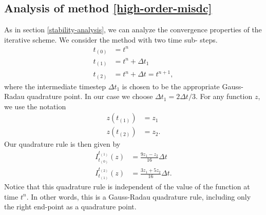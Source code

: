 \documentclass[12pt]{article}
\begin{document}
\subsection{Analysis of method \ref{high-order-misdc}}
As in section \ref{stability-analysis}, we can analyze the convergence 
properties of the iterative scheme. We consider the method with two time sub-%
steps.
\begin{align*}
    t_{(0)} &= t^n\\
    t_{(1)} &= t^n + \Delta t_1\\
    t_{(2)} &= t^n + \Delta t = t^{n+1},
\end{align*}
where the intermediate timestep $\Delta t_1$ is chosen to be the appropriate 
Gauss-Radau quadrature point. In our case we choose $\Delta t_1 = 2\Delta t/3$. 
For any function $z$, we use the notation
\begin{align*}
    z(t_{(1)}) &= z_1\\
    z(t_{(2)}) &= z_2.
\end{align*}
Our quadrature rule is then given by
\begin{align}
    I_{t_{(0)}}^{t_{(1)}}(z) &= \frac{9 z_1 - z_2}{16} \Delta t \label{qr-1}\\
    I_{t_{(1)}}^{t_{(2)}}(z) &= \frac{3 z_1 + 5 z_2}{16} \Delta t. \label{qr-2}
\end{align}
Notice that this quadrature rule is independent of the value of the function at 
time $t^n$. In other words, this is a Gauss-Radau quadrature rule, including 
only the right end-point as a quadrature point.
\end{document}
